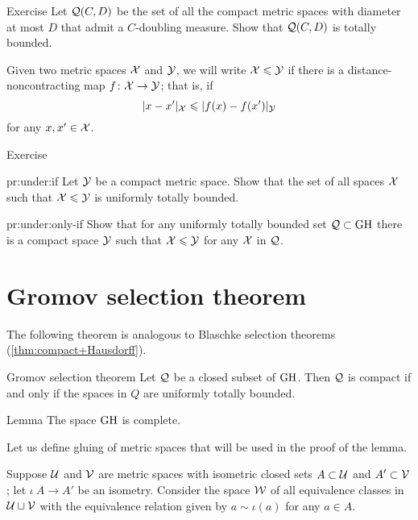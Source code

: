 \begin{thm}{Exercise}\label{pr:doubling}
Let $\mathcal{Q}(C,D)$ be the set of all the compact metric spaces with diameter at most $D$ that admit a $C$-doubling measure.
Show that $\mathcal{Q}(C,D)$ is totally bounded.
\end{thm}

Given two metric spaces $\mathcal{X}$ and $\mathcal{Y}$, we will write $\mathcal{X}\leqslant \mathcal{Y}$ if there is a distance-noncontracting map $f\colon\mathcal{X}\to \mathcal{Y}$;
that is, if 
$$ |x-x'|_{\mathcal{X}}\leqslant|f(x)-f(x')|_{\mathcal{Y}}$$
for any $x,x'\in \mathcal{X}$.

\begin{thm}{Exercise}\label{pr:under}

\begin{subthm}{pr:under:if}
Let $\mathcal{Y}$ be a compact metric space.
Show that the set of all spaces $\mathcal{X}$ such that $\mathcal{X}\leqslant\mathcal{Y}$
is uniformly totally bounded.
\end{subthm}

\begin{subthm}{pr:under:only-if}
Show that for any uniformly totally bounded set $\mathcal{Q}\subset\operatorname{\rm GH}\nolimits$ there is a compact space $\mathcal{Y}$
such that $\mathcal{X}\leqslant\mathcal{Y}$ for any $\mathcal{X}$ in $\mathcal{Q}$.
\end{subthm}

\end{thm}

\section{Gromov selection theorem}

The following theorem is analogous to Blaschke selection theorems (\ref{thm:compact+Hausdorff}).

\begin{thm}{Gromov selection theorem}\label{thm:gromov-compactness}
Let $\mathcal{Q}$ be a closed subset of $\operatorname{\rm GH}\nolimits$.
Then $\mathcal{Q}$ is compact if and only if the spaces in $Q$ are uniformly totally bounded.
\end{thm}

\begin{thm}{Lemma}\label{lem:GH-complete}
The space $\operatorname{\rm GH}\nolimits$ is complete.
\end{thm}


Let us define gluing of metric spaces that will be used in the proof of the lemma.

Suppose 
$\mathcal{U}$ and $\mathcal{V}$ are metric spaces 
with isometric closed sets $A\subset\mathcal{U}$ and $A'\subset\mathcal{V}$;
let $\iota\:A\to A'$ be an isometry.
Consider the space $\mathcal{W}$ of all equivalence classes in $\mathcal{U}\sqcup\mathcal{V}$ with the equivalence relation given by $a\sim\iota(a)$ for any $a\in A$.

